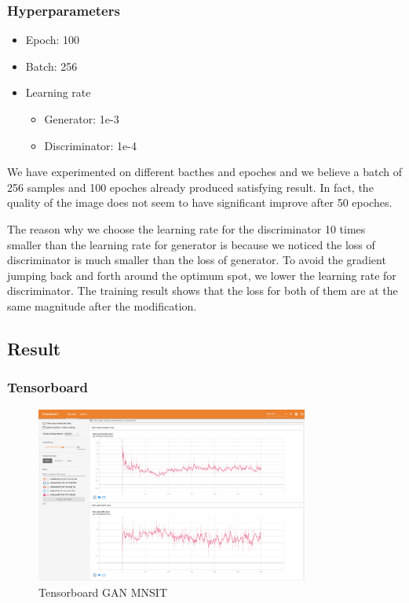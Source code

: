 \documentclass{article}
\begin{document}
\subsubsection{Hyperparameters}

\begin{itemize}
  \item Epoch: 100
  \item Batch: 256
  \item Learning rate
    \begin{itemize}
      \item Generator: 1e-3
      \item Discriminator: 1e-4
    \end{itemize}
\end{itemize}

We have experimented on different bacthes and epoches and we believe a batch of 256 samples and 100 epoches already produced satisfying result. 
In fact, the quality of the image does not seem to have significant improve after 50 epoches.

The reason why we choose the learning rate for the discriminator 10 times smaller than the learning rate for generator is 
because we noticed the loss of discriminator is much smaller than the loss of generator. 
To avoid the gradient jumping back and forth around the optimum spot, we lower the learning rate for discriminator.
The training result shows that the loss for both of them are at the same magnitude after the modification.

\subsection{Result}

\subsubsection{Tensorboard}

\begin{figure}[!htb]
  \centering
  \includegraphics[width=0.8\textwidth]{tensorboard-GAN-MNIST.png}
  \caption{Tensorboard GAN MNSIT}
  \label{fig:TB_GAN_MNSIT}
\end{figure}
\end{document}

